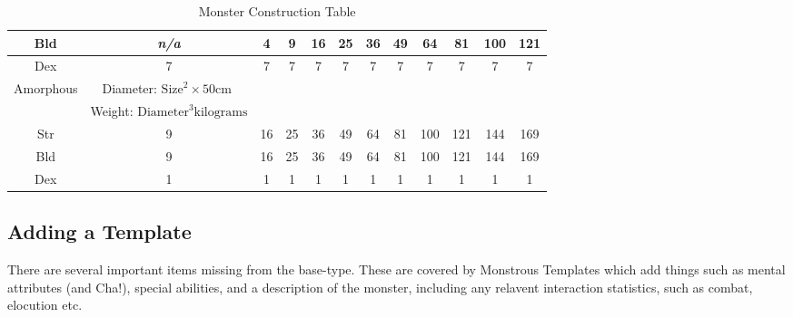 \documentclass[twoside]{book}
\begin{document}
\begin{table}[htb]
\begin{center}
\begin{tabular}{|c|c|c|c|c|c|c|c|c|c|c|c|}
 Bld &
                    \textit{n/a}
                  & 4 & 9 & 16 & 25 & 36 & 49 & 64 & 81 & 100 & 121 \\

\hline

 Dex & 7 & 7 & 7 & 7 & 7 & 7 & 7 & 7 & 7 & 7 & 7 \\

\hline

 Amorphous &  Diameter: \begin{math}  
                        {\textrm{Size}}^{ 2 }   \times   50 \textrm{cm
                          }  \end{math}
                  \\

\hline

& Weight: \begin{math}  
                        {\textrm{Diameter}}^{ 3 }  \textrm{kilograms}  \end{math}  
                  \\

\hline

 Str & 9 & 16 & 25 & 36 & 49 & 64 & 81 & 100 & 121 & 144 & 169 \\

\hline

 Bld & 9 & 16 & 25 & 36 & 49 & 64 & 81 & 100 & 121 & 144 & 169 \\

\hline

 Dex & 1 & 1 & 1 & 1 & 1 & 1 & 1 & 1 & 1 & 1 & 1 \\

\hline


  \end{tabular}
  
\caption{Monster Construction Table}
  
  \end{center}
\end{table}
  
    

\subsection{Adding a Template}
    
    {  
     There are several important items missing from the
               base-type. These are covered by Monstrous Templates which
               add things such as mental attributes (and Cha!), special
               abilities, and a description of the monster, including any
               relavent interaction statistics, such as combat, elocution
               etc. 
    }
  
\end{document}
